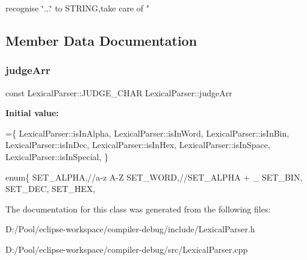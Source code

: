 recognise \char`\"{}...\char`\"{} to S\+T\+R\+I\+NG,take care of " 

\subsection{Member Data Documentation}
\mbox{\label{class_lexical_parser_a1786cf007498ae783ed4b02115a40268}} 
\subsubsection{\texorpdfstring{judge\+Arr}{judgeArr}}
{\footnotesize\ttfamily const Lexical\+Parser\+::\+J\+U\+D\+G\+E\+\_\+\+C\+H\+AR Lexical\+Parser\+::judge\+Arr\hspace{0.3cm}{\ttfamily [static]}}

{\bfseries Initial value\+:}
\begin{DoxyCode}
=\{
        LexicalParser::isInAlpha,
        LexicalParser::isInWord,
        LexicalParser::isInBin,
        LexicalParser::isInDec,
        LexicalParser::isInHex,
        LexicalParser::isInSpace,
        LexicalParser::isInSpecial,
\}
\end{DoxyCode}
enum\{ S\+E\+T\+\_\+\+A\+L\+P\+HA,//a-\/z A-\/Z S\+E\+T\+\_\+\+W\+O\+RD,//\+S\+E\+T\+\_\+\+A\+L\+P\+HA + \+\_\+ S\+E\+T\+\_\+\+B\+IN, S\+E\+T\+\_\+\+D\+EC, S\+E\+T\+\_\+\+H\+EX, 

The documentation for this class was generated from the following files\+:\begin{DoxyCompactItemize}
\item 
D\+:/\+Pool/eclipse-\/workspace/compiler-\/debug/include/Lexical\+Parser.\+h\item 
D\+:/\+Pool/eclipse-\/workspace/compiler-\/debug/src/Lexical\+Parser.\+cpp\end{DoxyCompactItemize}
